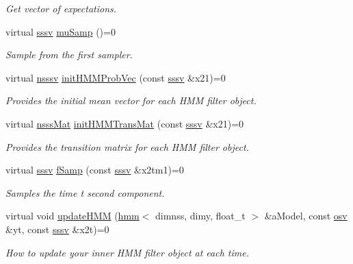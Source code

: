 \begin{DoxyCompactItemize}
\begin{DoxyCompactList}\small\item\em Get vector of expectations. \end{DoxyCompactList}\item 
virtual \hyperlink{classrbpf__hmm__bs_a9a1c8d64f693a34a902dbfcb009d0f96}{sssv} \hyperlink{classrbpf__hmm__bs_a0d380855c79be53e452ec2bd2af122d5}{mu\+Samp} ()=0
\begin{DoxyCompactList}\small\item\em Sample from the first sampler. \end{DoxyCompactList}\item 
virtual \hyperlink{classrbpf__hmm__bs_a98c86f40e4ca55ff16156077b11032ca}{nsssv} \hyperlink{classrbpf__hmm__bs_a0a8e40cbc6b4c8fefae66f03f28fafe1}{init\+H\+M\+M\+Prob\+Vec} (const \hyperlink{classrbpf__hmm__bs_a9a1c8d64f693a34a902dbfcb009d0f96}{sssv} \&x21)=0
\begin{DoxyCompactList}\small\item\em Provides the initial mean vector for each H\+MM filter object. \end{DoxyCompactList}\item 
virtual \hyperlink{classrbpf__hmm__bs_aa6ea87fa04659348fa4e4a52b97edc5c}{nsss\+Mat} \hyperlink{classrbpf__hmm__bs_a61a6679ada264fe9e4e0409dc93434f5}{init\+H\+M\+M\+Trans\+Mat} (const \hyperlink{classrbpf__hmm__bs_a9a1c8d64f693a34a902dbfcb009d0f96}{sssv} \&x21)=0
\begin{DoxyCompactList}\small\item\em Provides the transition matrix for each H\+MM filter object. \end{DoxyCompactList}\item 
virtual \hyperlink{classrbpf__hmm__bs_a9a1c8d64f693a34a902dbfcb009d0f96}{sssv} \hyperlink{classrbpf__hmm__bs_a92d27356a7b42d57ad99e4778bdabdec}{f\+Samp} (const \hyperlink{classrbpf__hmm__bs_a9a1c8d64f693a34a902dbfcb009d0f96}{sssv} \&x2tm1)=0
\begin{DoxyCompactList}\small\item\em Samples the time t second component. \end{DoxyCompactList}\item 
virtual void \hyperlink{classrbpf__hmm__bs_ac0332253c74384c27eaf81c75cf751aa}{update\+H\+MM} (\hyperlink{classhmm}{hmm}$<$ dimnss, dimy, float\+\_\+t $>$ \&a\+Model, const \hyperlink{classrbpf__hmm__bs_a6ec23f9c6eff96f8967c3c451c32b772}{osv} \&yt, const \hyperlink{classrbpf__hmm__bs_a9a1c8d64f693a34a902dbfcb009d0f96}{sssv} \&x2t)=0
\begin{DoxyCompactList}\small\item\em How to update your inner H\+MM filter object at each time. \end{DoxyCompactList}\end{DoxyCompactItemize}
